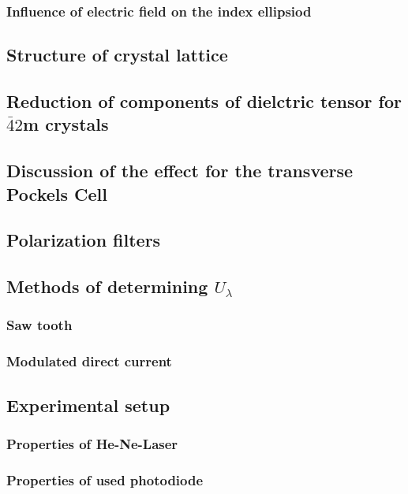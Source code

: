 \subsubsection{Influence of electric field on the index ellipsiod}

\subsection{Structure of crystal lattice}

\subsection{Reduction of components of dielctric tensor for $\bar{4}2$m crystals}

\subsection{Discussion of the effect for the transverse Pockels Cell}

\subsection{Polarization filters}

\subsection{Methods of determining $U_\lambda$}
\subsubsection{Saw tooth}
\subsubsection{Modulated direct current}

\subsection{Experimental setup}
\subsubsection{Properties of He-Ne-Laser}
\subsubsection{Properties of used photodiode}
